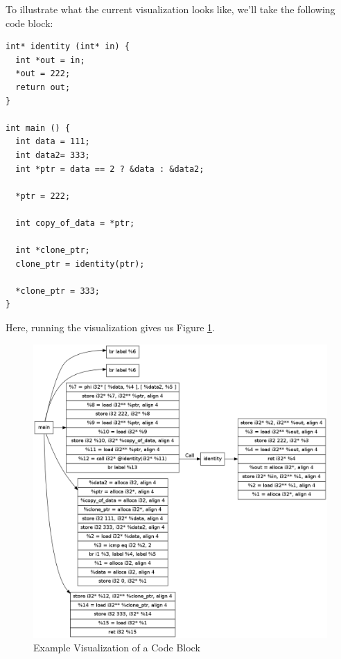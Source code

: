 To illustrate what the current visualization looks like, we'll take the
following code block:
\lstset{%
  basicstyle=\small,
  language=C,
  stringstyle=\ttfamily,
  showstringspaces=false,
  linewidth=\textwidth,
  tabsize=2,
  captionpos=b
}
\begin{lstlisting}
int* identity (int* in) {
  int *out = in;
  *out = 222;
  return out;
}

int main () {
  int data = 111;
  int data2= 333;
  int *ptr = data == 2 ? &data : &data2;

  *ptr = 222;

  int copy_of_data = *ptr;

  int *clone_ptr;
  clone_ptr = identity(ptr);

  *clone_ptr = 333;
}
\end{lstlisting}

Here, running the visualization gives us Figure \ref{fig:passes4-vis}.

\begin{figure}
\begin{center}
\leavevmode
\includegraphics[scale=0.4]{images/passes4.png}
\end{center}
\caption{Example Visualization of a Code Block}
\label{fig:passes4-vis}
\end{figure}
